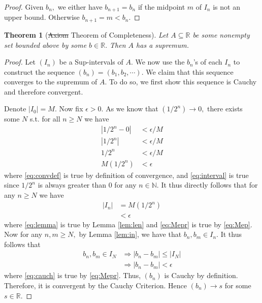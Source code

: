 \documentclass[10pt]{article}
\newtheorem{theorem}{Theorem}[]
\begin{document}
\begin{proof}
    Given $b_n,$ we either have $b_{n+1}=b_n$ if the midpoint $m$ of $I_n$ is not an upper bound. Otherwise $b_{n+1}=m < b_n.$
\end{proof}


\begin{theorem}[\st{Axiom} Theorem of Completeness]
    Let $A\subseteq \mathbb{R}$ be some nonempty set bounded above by some $b\in\mathbb{R}.$ Then $A$ has a supremum.
\end{theorem}

\begin{proof}
   Let $(I_n)$ be a Sup-intervals of $A.$
    We now use the $b_n$'s of each $I_n$ to  construct the sequence $(b_n) = (b_1, b_2,\cdots).$ We claim that this sequence converges to the supremum of $A$. To do so, we first show this sequence is Cauchy and therefore convergent.

    Denote $|I_0|=M.$
    Now fix $\epsilon>0.$ As we know that $(1/2^n)\to 0,$ there exists some $N$ s.t. for all $n\ge N$ we have
    \begin{align}
        |1/2^n - 0| &< \epsilon/M \label{eq:convdef}\\
        |1/2^n| &< \epsilon/M \nonumber\\
        1/2^n &< \epsilon/M \label{eq:interval}\\
        M(1/2^n) &< \epsilon \label{eq:Mep}
    \end{align}
    where \eqref{eq:convdef} is true by definition of convergence, and \eqref{eq:interval} is true since $1/2^n$ is always greater than $0$ for any $n\in\mathbb{N}.$
    It thus directly follows that for any $n\ge N$ we have
    \begin{align}
        |I_n| &= M(1/2^n) \label{eq:lemma}\\
        &< \epsilon \label{eq:Mepr}
    \end{align}
    where \eqref{eq:lemma} is true by Lemma \ref{lem:len} and \eqref{eq:Mepr} is true by \eqref{eq:Mep}.
    Now for any $n,m\ge N,$ by Lemma \ref{lem:in}, we have that $b_n,b_m\in I_n.$
    It thus follows that
    \begin{align}
        b_n,b_m\in I_N &\Rightarrow
        |b_n-b_m| \le |I_N| \nonumber\\
        &\Rightarrow|b_n-b_m| < \epsilon \label{eq:cauch}
    \end{align} 
    where \eqref{eq:cauch} is true by \eqref{eq:Mepr}.
    Thus, $(b_n)$ is Cauchy by definition. Therefore, it is convergent by the Cauchy Criterion. Hence $(b_n)\to s$ for some  $s\in\mathbb{R}.$


\end{proof}
\end{document}
